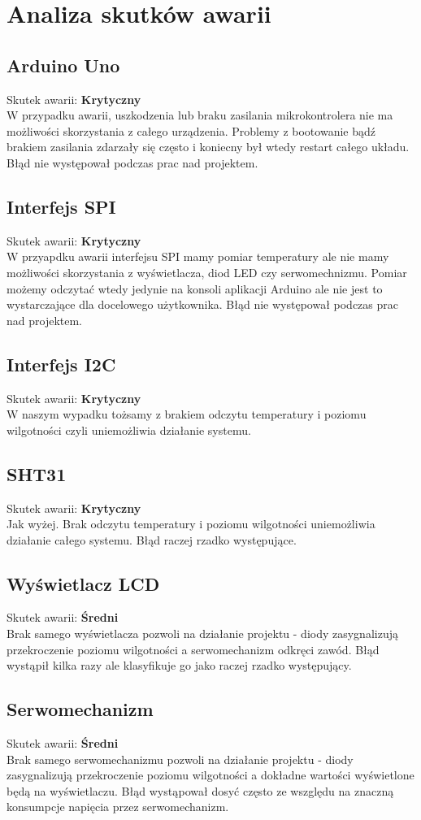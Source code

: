 \documentclass{classrep}
\begin{document}
\section{Analiza skutków awarii}
\subsection {Arduino Uno}
Skutek awarii: \textbf{Krytyczny}\\
W przypadku awarii, uszkodzenia lub braku zasilania mikrokontrolera nie ma możliwości skorzystania z całego urządzenia. Problemy z bootowanie bądź brakiem zasilania zdarzały się często i koniecny był wtedy restart całego układu. Błąd nie występował podczas prac nad projektem.
\subsection {Interfejs SPI}
Skutek awarii: \textbf{Krytyczny}\\
W przyapdku awarii interfejsu SPI mamy pomiar temperatury ale nie mamy możliwości skorzystania z wyświetlacza, diod LED czy serwomechnizmu. Pomiar możemy odczytać wtedy jedynie na konsoli aplikacji Arduino ale nie jest to wystarczające dla docelowego użytkownika. Błąd nie występował podczas prac nad projektem.
\subsection {Interfejs I2C}
Skutek awarii: \textbf{Krytyczny}\\
W naszym wypadku tożsamy z brakiem odczytu temperatury i poziomu wilgotności czyli uniemożliwia działanie systemu.
\subsection {SHT31}
Skutek awarii: \textbf{Krytyczny}\\
Jak wyżej. Brak odczytu temperatury i poziomu wilgotności uniemożliwia działanie całego systemu. Błąd raczej rzadko występujące.
\subsection {Wyświetlacz LCD}
Skutek awarii: \textbf{Średni}\\
Brak samego wyświetlacza pozwoli na działanie projektu - diody zasygnalizują przekroczenie poziomu wilgotności a serwomechanizm odkręci zawód. Błąd wystąpił kilka razy ale klasyfikuje go jako raczej rzadko występujący.
\subsection {Serwomechanizm}
Skutek awarii: \textbf{Średni}\\
Brak samego serwomechanizmu pozwoli na działanie projektu - diody zasygnalizują przekroczenie poziomu wilgotności a dokładne wartości wyświetlone będą na wyświetlaczu. Błąd wystąpował dosyć często ze wszględu na znaczną konsumpcje napięcia przez serwomechanizm.
\end{document}
